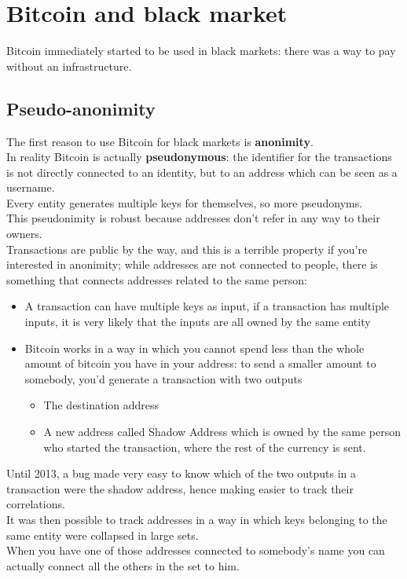 \section{Bitcoin and black market}
    Bitcoin immediately started to be used in black markets: there was a way to pay without an infrastructure.
    \subsection{Pseudo-anonimity}
        The first reason to use Bitcoin for black markets is \textbf{anonimity}.\\ 
        In reality Bitcoin is actually \textbf{pseudonymous}: the identifier for the transactions is not directly connected to an identity, but to an address which can be seen as a username.\\
        Every entity generates multiple keys for themselves, so more pseudonyms.\\ 
        This pseudonimity is robust because addresses don't refer in any way to their owners.\\
        Transactions are public by the way, and this is a terrible property if you're interested in anonimity; while addresses are not connected to people, there is something that connects addresses related to the same person:
        \begin{itemize}
            \item A transaction can have multiple keys as input, if a transaction has multiple inputs, it is very likely that the inputs are all owned by the same entity
            \item Bitcoin works in a way in which you cannot spend less than the whole amount of bitcoin you have in your address: to send a smaller amount to somebody, you'd generate a transaction with two outputs
            \begin{itemize}
                \item The destination address
                \item A new address called Shadow Address which is owned by the same person who started the transaction, where the rest of the currency is sent.
            \end{itemize}
        \end{itemize}
        Until 2013, a bug made very easy to know which of the two outputs in a transaction were the shadow address, hence making easier to track their correlations.\\
        It was then possible to track addresses in a way in which keys belonging to the same entity were collapsed in large sets.\\ 
        When you have one of those addresses connected to somebody's name you can actually connect all the others in the set to him.
